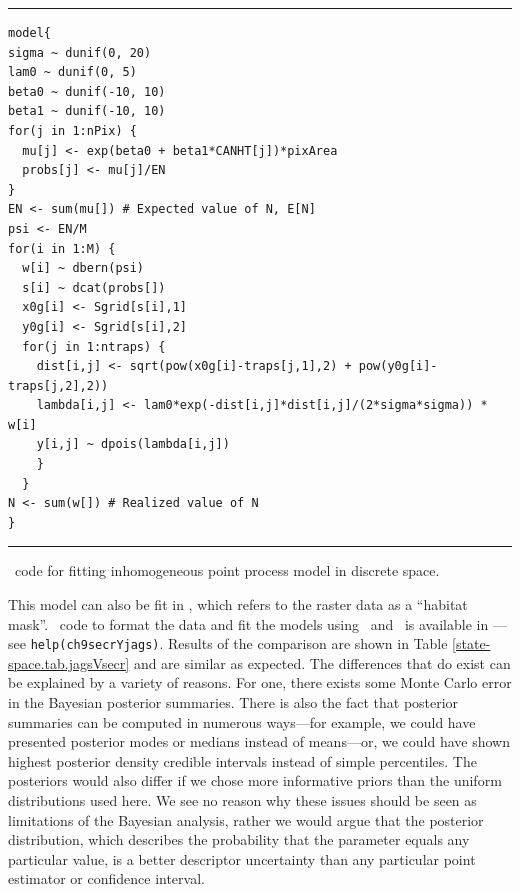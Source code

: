 \begin{panel}%
\centering
\rule[0.15in]{\textwidth}{.03in}
\begin{small}
\begin{verbatim}
model{
sigma ~ dunif(0, 20)
lam0 ~ dunif(0, 5)
beta0 ~ dunif(-10, 10)
beta1 ~ dunif(-10, 10)
for(j in 1:nPix) {
  mu[j] <- exp(beta0 + beta1*CANHT[j])*pixArea
  probs[j] <- mu[j]/EN
}
EN <- sum(mu[]) # Expected value of N, E[N]
psi <- EN/M
for(i in 1:M) {
  w[i] ~ dbern(psi)
  s[i] ~ dcat(probs[])
  x0g[i] <- Sgrid[s[i],1]
  y0g[i] <- Sgrid[s[i],2]
  for(j in 1:ntraps) {
    dist[i,j] <- sqrt(pow(x0g[i]-traps[j,1],2) + pow(y0g[i]-traps[j,2],2))
    lambda[i,j] <- lam0*exp(-dist[i,j]*dist[i,j]/(2*sigma*sigma)) * w[i]
    y[i,j] ~ dpois(lambda[i,j])
    }
  }
N <- sum(w[]) # Realized value of N
}
\end{verbatim}
\end{small}
\rule[0.15in]{\textwidth}{.03in}
\caption{\bugs~code for fitting inhomogeneous point process model in
  discrete space.}
\label{state-space.panel1}
\end{panel}

This model can also be fit in \secr, which refers
to the raster data as a ``habitat mask''. \R~code to format the data
and fit the models using \secr~and \jags~is available in \scrbook---see
\verb#help(ch9secrYjags)#. Results of the
comparison are shown in Table \ref{state-space.tab.jagsVsecr} and are
similar as expected. The differences that do exist can be
explained by a variety of reasons. For one, there exists some Monte
Carlo error in the Bayesian posterior summaries. There is also the
fact that posterior summaries can be computed in numerous ways---for
example, we could have presented posterior modes or medians instead of
means---or, we could have shown highest posterior density credible
intervals instead of simple percentiles. The posteriors would also
differ if we chose more informative priors than the uniform
distributions used here. We see no reason why these
issues should be seen as limitations of the Bayesian analysis, rather
we would argue that the posterior distribution, which describes the
probability that the parameter equals any particular value, is a
better descriptor uncertainty than any particular point estimator or
confidence interval. %


